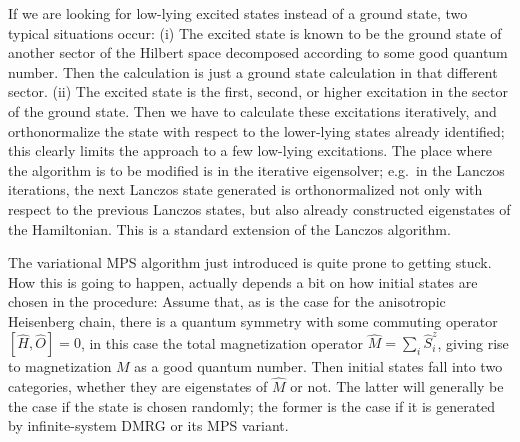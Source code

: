 If we are looking for low-lying excited states instead of a ground state, two typical situations occur: 
(i) The excited state is known to be the ground state of another sector of the Hilbert space decomposed according to some good quantum number. Then the calculation is just a ground state calculation in that different sector. (ii) The excited state is the first, second, or higher excitation in the sector of the ground state. Then we have to calculate these excitations iteratively, and orthonormalize the state with respect to the lower-lying states already identified; this clearly limits the approach to a few low-lying excitations. The place where the algorithm is to be modified is in the iterative eigensolver; e.g.\ in the Lanczos iterations, the next Lanczos state generated is orthonormalized not only with respect to the previous Lanczos states, but also already constructed eigenstates of the Hamiltonian. This is a standard extension of the Lanczos algorithm.
 
The variational MPS algorithm just introduced is quite prone to getting stuck. How this is going to happen, actually depends a bit on how initial states are chosen in the procedure: Assume that, as is the case for the anisotropic Heisenberg chain, there is a quantum symmetry with some commuting operator $[\hat{H},\hat{O}]=0$, in this case the total magnetization operator $\hat{M}=\sum_i \hat{S}^z_i$, giving rise to magnetization $M$ as a good quantum number. Then initial states fall into two categories, whether they are eigenstates of $\hat{M}$ or not. The latter will generally be the case if the state is chosen randomly; the former is the case if it is generated by infinite-system DMRG or its MPS variant. 

